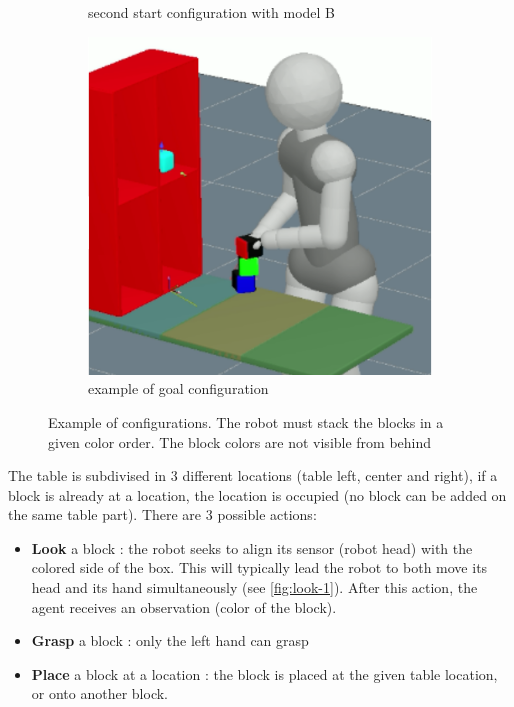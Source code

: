 \documentclass[conference]{IEEEtran}
\begin{document}
\begin{figure}
\begin{subfigure}[t]{0.15\textwidth}
            \caption{second start configuration with model B}
        \label{fig:start-2}
        \end{subfigure}
        \hfill
        \begin{subfigure}[t]{0.15\textwidth}
            \includegraphics[width=\textwidth]{images/suss-c.png}
            \caption{example of goal configuration}
        \end{subfigure}
        \caption{Example of configurations. The robot must stack the blocks in a given color order. The block colors are not visible from behind}
\label{fig:sussman}
\end{figure}
The table is subdivised in 3 different locations (table left, center and right), if a block is already at a location, the location is occupied (no block can be added on the same table part). There are 3 possible actions: 
\begin{itemize}
\item \textbf{Look} a block : the robot seeks to align its sensor (robot head) with the colored side of the box. This will typically lead the robot to both move its head and its hand simultaneously (see \ref{fig:look-1}). After this action, the agent receives an observation (color of the block).
\item \textbf{Grasp} a block : only the left hand can grasp
\item \textbf{Place} a block at a location : the block is placed at the given table location, or onto another block.
\end{itemize}
\end{document}

